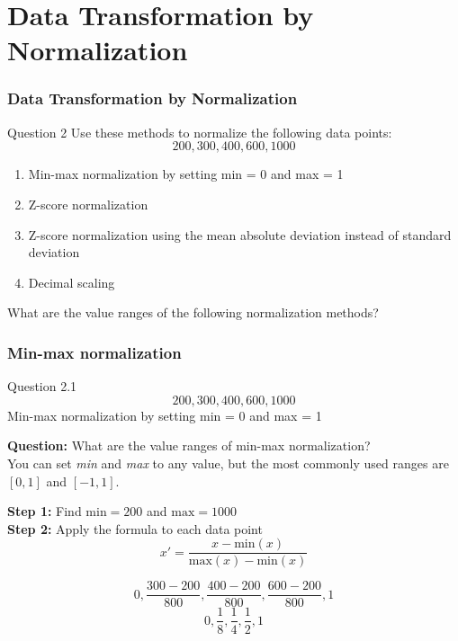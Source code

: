 \documentclass[aspectratio=169, 10pt]{beamer}
\begin{document}
\section{Data Transformation by Normalization}
\begin{frame}[t]
    \frametitle{Data Transformation by Normalization}

    \begin{block}{Question 2}
        Use these methods to normalize the following data points:
        \[200, 300, 400, 600, 1000\]
    \end{block}

    \begin{enumerate}
        \item Min-max normalization by setting min = 0 and max = 1
        \item Z-score normalization
        \item Z-score normalization using the mean absolute deviation instead of standard deviation
        \item Decimal scaling
    \end{enumerate}

    What are the value ranges of the following normalization methods?

\end{frame}


\begin{frame}[t]
    \frametitle{Min-max normalization}
    \small

    \begin{block}{Question 2.1}
        \[200, 300, 400, 600, 1000\]
        Min-max normalization by setting min = 0 and max = 1
    \end{block}

    \textbf{Question:} What are the value ranges of min-max normalization?\\
    You can set \textit{min} and \textit{max} to any value, but the most commonly used ranges are $[0, 1]$ and $[-1, 1]$.\\

    \vspace{1em}

    \textbf{Step 1:} Find $\text{min}=200$ and $\text{max}=1000$\\
    \textbf{Step 2:} Apply the formula to each data point
    \[x' = \frac{x - \text{min}(x)}{ \text{max}(x) - \text{min}(x)}\]

    \[0, \frac{300-200}{800}, \frac{400-200}{800}, \frac{600-200}{800}, 1\]
    \[0, \frac{1}{8}, \frac{1}{4}, \frac{1}{2}, 1\]

\end{frame}
\end{document}
